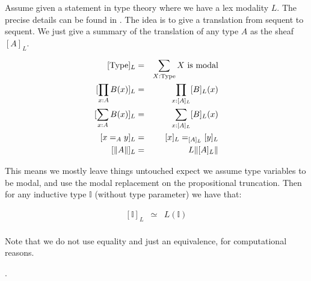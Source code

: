 Assume given a statement in type theory where we have a lex modality $L$. The precise details can be found in . The idea is to give a translation from sequent to sequent. We just give a summary of the translation of any type $A$ as the sheaf $[A]_L$.

\begin{eqnarray}
{[\mathrm{Type}]_L} &=& \sum_{X:\mathrm{Type}} X\ \mathrm{is\ modal}\\
{[\prod_{x:A}B(x)]_L} &=& \prod_{x:[A]_L}[B]_L(x)\\
{[\sum_{x:A}B(x)]_L} &=& \sum_{x:[A]_L}[B]_L(x)\\
{[x=_Ay]_L} &=& [x]_L=_{[A]_L}[y]_L\\
{[\propTrunc{A}]_L} &=& L\propTrunc{[A]_L}
\end{eqnarray}

This means we mostly leave things untouched expect we assume type variables to be modal, and use the modal replacement on the propositional truncation. Then for any inductive type $\mathbb{I}$ (without type parameter) we have that:

\begin{eqnarray}
{[\mathbb{I}]_L} &\simeq& L(\mathbb{I})\\
\end{eqnarray}

Note that we do not use equality and just an equivalence, for computational reasons.

.

